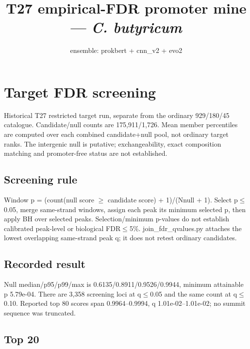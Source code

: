 \documentclass{article}
\title{T27 empirical-FDR promoter mine --- \textit{C. butyricum}}
\date{ensemble: prokbert + cnn\_v2 + evo2}
\begin{document}
\maketitle
\section{Target FDR screening}\label{target-fdr-screening}

Historical T27 restricted target run, separate from the ordinary 929/180/45 catalogue. Candidate/null counts are 175,911/1,726. Mean member percentiles are computed over each combined candidate+null pool, not ordinary target ranks. The intergenic null is putative; exchangeability, exact composition matching and promoter-free status are not established.

\subsection{Screening rule}\label{screening-rule}

Window p = (count(null score \ensuremath{\geq} candidate score) + 1)/(Nnull + 1). Select p\ensuremath{\leq}0.05, merge same-strand windows, assign each peak its minimum selected p, then apply BH over selected peaks. Selection/minimum p-values do not establish calibrated peak-level or biological FDR\ensuremath{\leq}5\%. join\_fdr\_qvalues.py attaches the lowest overlapping same-strand peak q; it does not retest ordinary candidates.

\subsection{Recorded result}\label{recorded-result}

Null median/p95/p99/max is 0.6135/0.8911/0.9526/0.9944, minimum attainable p 5.79e-04. There are 3,358 screening loci at q\ensuremath{\leq}0.05 and the same count at q\ensuremath{\leq}0.10. Reported top 80 scores span 0.9964--0.9994, q 1.01e-02--1.01e-02; no summit sequence was truncated.

\subsection{Top 20}\label{top-20}
\end{document}
